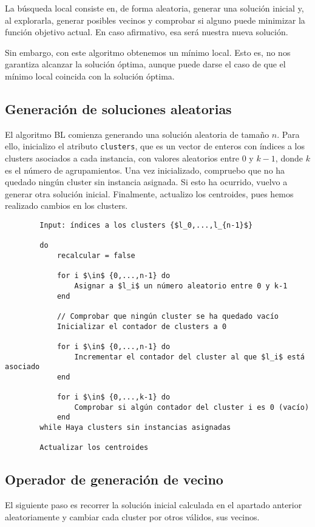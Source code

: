 	La búsqueda local consiste en, de forma aleatoria, generar una solución inicial y, al explorarla, generar posibles 
	vecinos y comprobar si alguno puede minimizar la función objetivo actual. En caso afirmativo, esa será nuestra nueva
	solución.

	Sin embargo, con este algoritmo obtenemos un mínimo local. Esto es, no nos garantiza alcanzar la solución óptima, aunque 
	puede darse el caso de que el mínimo local coincida con la solución óptima.

	\subsection{Generación de soluciones aleatorias}
		El algoritmo BL comienza generando una solución aleatoria de tamaño $n$. Para ello, inicializo el atributo \lstinline!clusters!, que 
		es un vector de enteros con índices a los clusters asociados a cada instancia, con valores aleatorios entre $0$ y $k-1$, 
		donde $k$ es el número de agrupamientos. Una vez inicializado, compruebo que no ha quedado ningún cluster sin instancia asignada.
		Si esto ha ocurrido, vuelvo a generar otra solución inicial. Finalmente, actualizo los centroides, pues hemos realizado cambios en los clusters.

		\begin{lstlisting}
		Input: índices a los clusters {$l_0,...,l_{n-1}$}

		do 
			recalcular = false
			
			for i $\in$ {0,...,n-1} do 
				Asignar a $l_i$ un número aleatorio entre 0 y k-1
			end
			
			// Comprobar que ningún cluster se ha quedado vacío
			Inicializar el contador de clusters a 0
			
			for i $\in$ {0,...,n-1} do 
				Incrementar el contador del cluster al que $l_i$ está asociado
			end
			
			for i $\in$ {0,...,k-1} do
				Comprobar si algún contador del cluster i es 0 (vacío)
			end
		while Haya clusters sin instancias asignadas
		
		Actualizar los centroides
		\end{lstlisting}

	\subsection{Operador de generación de vecino}
		El siguiente paso es recorrer la solución inicial calculada en el apartado anterior aleatoriamente
		y cambiar cada cluster por otros válidos, sus vecinos.


